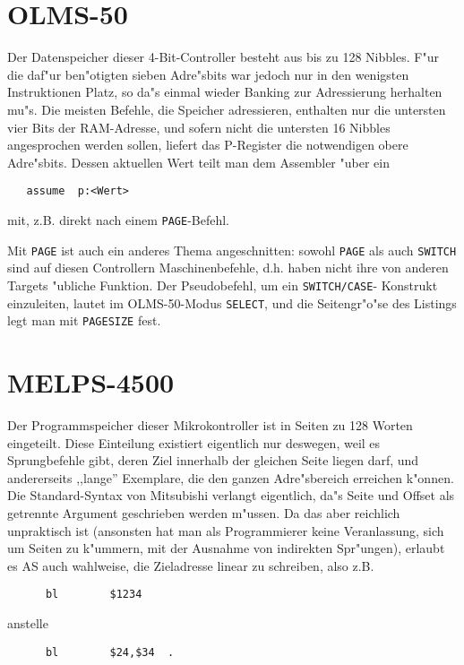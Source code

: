 \documentclass[12pt,a4paper,twoside]{report}
\newcommand{\tty}[1]{{\tt #1}}
\begin{document}

\section{OLMS-50}

Der Datenspeicher dieser 4-Bit-Controller besteht aus bis zu 128
Nibbles.  F"ur die daf"ur ben"otigten sieben Adre"sbits war
jedoch nur in den wenigsten Instruktionen Platz, so da"s einmal
wieder Banking zur Adressierung herhalten mu"s.  Die meisten
Befehle, die Speicher adressieren, enthalten nur die untersten
vier Bits der RAM-Adresse, und sofern nicht die untersten 16
Nibbles angesprochen werden sollen, liefert das P-Register die
notwendigen obere Adre"sbits.  Dessen aktuellen Wert teilt man
dem Assembler "uber ein
\begin{verbatim}
   assume  p:<Wert>
\end{verbatim}
mit, z.B. direkt nach einem \tty{PAGE}-Befehl.

Mit \tty{PAGE} ist auch ein anderes Thema angeschnitten: sowohl
\tty{PAGE} als auch \tty{SWITCH} sind auf diesen Controllern
Maschinenbefehle, d.h. haben nicht ihre von anderen Targets
"ubliche Funktion.  Der Pseudobefehl, um ein \tty{SWITCH/CASE}-
Konstrukt einzuleiten, lautet im OLMS-50-Modus \tty{SELECT}, und
die Seitengr"o"se des Listings legt man mit \tty{PAGESIZE} fest.


\section{MELPS-4500}

Der Programmspeicher dieser Mikrokontroller ist in Seiten zu
128 Worten eingeteilt.  Diese Einteilung existiert eigentlich nur
deswegen, weil es Sprungbefehle gibt, deren Ziel innerhalb der
gleichen Seite liegen darf, und andererseits ,,lange'' Exemplare,
die den ganzen Adre"sbereich erreichen k"onnen.  Die Standard-Syntax
von Mitsubishi verlangt eigentlich, da"s Seite und Offset als getrennte
Argument geschrieben werden m"ussen.  Da das aber reichlich unpraktisch
ist (ansonsten hat man als Programmierer keine Veranlassung, sich um
Seiten zu k"ummern, mit der Ausnahme von indirekten Spr"ungen), erlaubt
es AS auch wahlweise, die Zieladresse linear zu schreiben, also z.B.
\begin{verbatim}
      bl        $1234
\end{verbatim}
anstelle
\begin{verbatim}
      bl        $24,$34  .
\end{verbatim}
\end{document}
